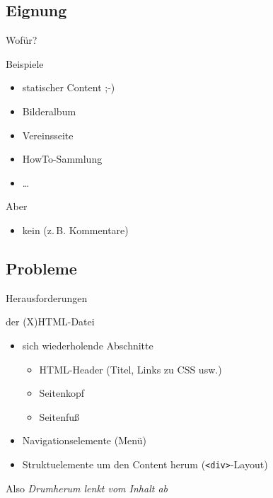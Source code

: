 \documentclass[hyperref={pdfpagelabels=false}]{beamer}
\begin{document}
\subsection{Eignung}

\begin{frame}{Wofür?}
    \begin{block}{Beispiele}
        \begin{itemize}
            \item statischer Content ;-)
            \item Bilderalbum
            \item Vereinsseite
            \item HowTo-Sammlung
            \item \dots
        \end{itemize}
    \end{block}
    \pause
    \begin{block}{Aber}
        \begin{itemize}
            \item kein  (z.\,B. Kommentare)
        \end{itemize}
    \end{block}
\end{frame}

\subsection{Probleme}

\begin{frame}{Herausforderungen}
    \begin{block}{ der (X)HTML-Datei}
        \begin{itemize}
            \item sich wiederholende Abschnitte
                \begin{itemize}
                    \item HTML-Header (Titel, Links zu CSS usw.)
                    \item Seitenkopf
                    \item Seitenfuß
                \end{itemize}
            \pause
            \item Navigationselemente (Menü)
            \item Struktuelemente um den Content herum (\texttt{<div>}-Layout)
        \end{itemize}
        \pause
        \begin{block}{Also}
            \emph{ Drumherum lenkt vom Inhalt ab}
        \end{block}
    \end{block}
\end{frame}
\end{document}
